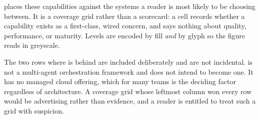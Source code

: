 

 places these capabilities against the systems a reader is
most likely to be choosing between. It is a coverage grid rather than a scorecard: a
cell records whether a capability exists as a first-class, wired concern, and says
nothing about quality, performance, or maturity. Levels are encoded by fill
\emph{and} by glyph so the figure reads in greyscale.

The two rows where \sys is behind are included deliberately and are not
incidental. \sys is not a multi-agent orchestration framework and does not intend
to become one. It has no managed cloud offering, which for many teams is the
deciding factor regardless of architecture. A coverage grid whose leftmost column
won every row would be advertising rather than evidence, and a reader is entitled to
treat such a grid with suspicion.
